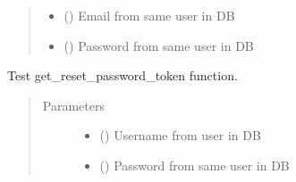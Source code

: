 \documentclass[letterpaper,10pt,english]{sphinxmanual}
\begin{document}
\begin{fulllineitems}
\begin{fulllineitems}
\begin{quote}
\begin{description}
\begin{itemize}
\item {} 
\sphinxAtStartPar
{} () \textendash{} Email from same user in DB

\item {} 
\sphinxAtStartPar
{} () \textendash{} Password from same user in DB

\end{itemize}

\end{description}\end{quote}

\end{fulllineitems}


\begin{fulllineitems}
\label{\detokenize{CE_app.tests:CE_app.tests.test_user.UserTestCase.test_get_reset_password_token}}
\sphinxAtStartPar
Test get\_reset\_password\_token function.
\begin{quote}\begin{description}
\item[{Parameters}] \leavevmode\begin{itemize}
\item {} 
\sphinxAtStartPar
{} () \textendash{} Username from user in DB

\item {} 
\sphinxAtStartPar
{} () \textendash{} Password from same user in DB

\end{itemize}

\end{description}\end{quote}


\end{fulllineitems}
\end{fulllineitems}
\end{document}
